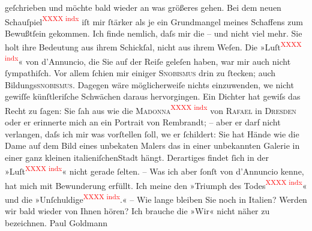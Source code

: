 {\begin{ledgroupsized}[t]{13cm}
               geſchrieben und möchte bald wieder an was größeres gehen. Bei dem neuen Schauſpiel\textcolor{red}{\textsuperscript{XXXX indx}} iſt mir ſtärker als je
               ein Grundmangel {\pb}meines Schaffens zum Bewußtſein
               gekommen. Ich finde nemlich, daſs mir die \label{K_L00787_3v}\label{K_L00787_3h} – und nicht viel mehr.
               Sie holt ihre Bedeutung aus ihrem Schickſal, nicht aus ihrem Weſen.\pend
           \pstart
           Die »Luſt\textcolor{red}{\textsuperscript{XXXX indx}}« von d’Annuncio, die Sie auf der Reiſe geleſen haben, war mir auch nicht
               ſympathiſch. Vor allem ſchien mir einiger \textsc{Snobismus}{ }{\pb}drin zu ſtecken; auch Bildungs\textsc{snobismus}. Dagegen wäre möglicherweiſe nichts einzuwenden,
                  we{\geminationn} nicht gewiſſe künſtleriſche Schwächen daraus
               hervorgingen. Ein Dichter hat gewiſs das Recht zu ſagen: Sie ſah aus wie die \textsc{Madonna}\textcolor{red}{\textsuperscript{XXXX indx}} von \textsc{Rafael} in \textsc{Dresden} oder er erinnerte mich an ein Portrait von Rembrandt; – aber er darf nicht verlangen, daſs ich mir was vorſtellen ſoll,
                  we{\geminationn} er ſchildert: Sie hat Hände wie die {\pb}Dame auf dem Bild eines unbeka{\geminationn}ten Malers das in einer unbekannten Galerie in einer
               ganz kleinen italieniſchenStadt hängt. Derartiges findet ſich in der »Luſt\textcolor{red}{\textsuperscript{XXXX indx}}« nicht gerade ſelten. – Was ich aber ſonſt von
                  d’Annuncio kenne, hat mich mit Bewunderung
               erfüllt. Ich meine den »Triumph des Todes\textcolor{red}{\textsuperscript{XXXX indx}}« und die
                  »Unſchuldige\textcolor{red}{\textsuperscript{XXXX indx}}.« –\pend
           \pstart
           Wie lange bleiben Sie noch in Italien? Werden wir
               bald wieder von {\pb}Ihnen hören? Ich brauche die
               »Wir« nicht näher zu bezeichnen. Paul Goldmann

\end{ledgroupsized}}

